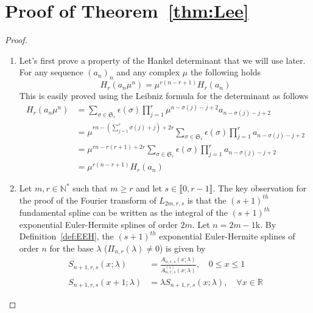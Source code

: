 \section{Proof of Theorem~\ref{thm:Lee}}\label{proof:Lee}

\begin{proof}
  \begin{enumerate}
    \item Let's first prove a property of the Hankel determinant that we will use later. For any sequence ${(a_n)}_n$ 
      and any complex $\mu$ the following holds
      \begin{equation}\label{prop:hankel}
	H_r(a_n \mu^n) = \mu^{r(n-r+1)} H_r(a_n)
      \end{equation}
      This is easily proved using the Leibniz formula for the determinant as follows
      \begin{align*}
	H_r(a_n \mu^n) &= \sum_{\sigma \in \mathfrak{S}_r} \epsilon(\sigma) \prod_{j=1}^r \mu^{n-\sigma(j) - j+2} 
	a_{n-\sigma(j)-j+2} \\
	&= \mu^{rn-(\sum_{j=1}^r \sigma(j) + j) + 2r} \sum_{\sigma \in \mathfrak{S}_r} \epsilon(\sigma) \prod_{j=1}^r  
	a_{n-\sigma(j)-j+2} \\
	&= \mu^{rn-r(r+1) + 2r} \sum_{\sigma \in \mathfrak{S}_r} \epsilon(\sigma) \prod_{j=1}^r  a_{n-\sigma(j)-j+2} \\
	&= \mu^{r(n-r+1)} H_r(a_n)
      \end{align*}
    \item Let $m, r \in \mathbb{N}^*$ such that $m \geq r$ and let $s \in \llbracket0, r-1\rrbracket$. The key 
      observation for the proof of the Fourier transform of $L_{2m,r,s}$ is that the $(s+1)^{th}$ fundamental spline can 
      be written as the integral of the $(s+1)^{th}$ exponential Euler-Hermite splines of order $2m$. Let $n=2m-1$k. By 
      Definition~\ref{def:EEH}, the $(s+1)^{th}$ exponential Euler-Hermite splines of order $n$ for the base $\lambda$ 
      ($\Pi_{n,r}(\lambda) \neq 0$) is given by
      \begin{align}
	S_{n+1,r,s}(x;\lambda) &= \frac{A_{n,r,s}(x; \lambda)}{A_{n,r,s}^{(s)}(x; \lambda)}, \quad 0 \leq x \leq 1 \\
	S_{n+1,r,s}(x+1;\lambda) &= \lambda S_{n+1,r,s}(x;\lambda), \quad \forall x \in \mathbb{R}
      \end{align}
	

\end{enumerate}
\end{proof}

